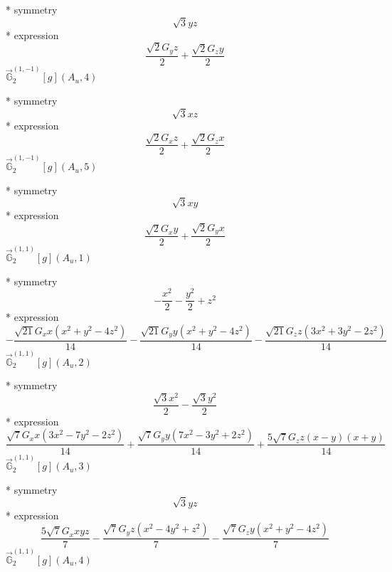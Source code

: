 \documentclass[fleqn,8pt]{jsarticle}
\begin{document}
\noindent\quad ** symmetry
\begin{dmath*}
\sqrt{3} y z
\end{dmath*}
\noindent\quad ** expression
\begin{dmath*}
\frac{\sqrt{2} G_{y} z}{2} + \frac{\sqrt{2} G_{z} y}{2}
\end{dmath*}
\noindent\quad $\vec{\mathbb{G}}_{2}^{(1,-1)}[g](A_{u},4)$

\noindent\quad ** symmetry
\begin{dmath*}
\sqrt{3} x z
\end{dmath*}
\noindent\quad ** expression
\begin{dmath*}
\frac{\sqrt{2} G_{x} z}{2} + \frac{\sqrt{2} G_{z} x}{2}
\end{dmath*}
\noindent\quad $\vec{\mathbb{G}}_{2}^{(1,-1)}[g](A_{u},5)$

\noindent\quad ** symmetry
\begin{dmath*}
\sqrt{3} x y
\end{dmath*}
\noindent\quad ** expression
\begin{dmath*}
\frac{\sqrt{2} G_{x} y}{2} + \frac{\sqrt{2} G_{y} x}{2}
\end{dmath*}
\noindent\quad $\vec{\mathbb{G}}_{2}^{(1,1)}[g](A_{u},1)$

\noindent\quad ** symmetry
\begin{dmath*}
- \frac{x^{2}}{2} - \frac{y^{2}}{2} + z^{2}
\end{dmath*}
\noindent\quad ** expression
\begin{dmath*}
- \frac{\sqrt{21} G_{x} x \left(x^{2} + y^{2} - 4 z^{2}\right)}{14} - \frac{\sqrt{21} G_{y} y \left(x^{2} + y^{2} - 4 z^{2}\right)}{14} - \frac{\sqrt{21} G_{z} z \left(3 x^{2} + 3 y^{2} - 2 z^{2}\right)}{14}
\end{dmath*}
\noindent\quad $\vec{\mathbb{G}}_{2}^{(1,1)}[g](A_{u},2)$

\noindent\quad ** symmetry
\begin{dmath*}
\frac{\sqrt{3} x^{2}}{2} - \frac{\sqrt{3} y^{2}}{2}
\end{dmath*}
\noindent\quad ** expression
\begin{dmath*}
\frac{\sqrt{7} G_{x} x \left(3 x^{2} - 7 y^{2} - 2 z^{2}\right)}{14} + \frac{\sqrt{7} G_{y} y \left(7 x^{2} - 3 y^{2} + 2 z^{2}\right)}{14} + \frac{5 \sqrt{7} G_{z} z \left(x - y\right) \left(x + y\right)}{14}
\end{dmath*}
\noindent\quad $\vec{\mathbb{G}}_{2}^{(1,1)}[g](A_{u},3)$

\noindent\quad ** symmetry
\begin{dmath*}
\sqrt{3} y z
\end{dmath*}
\noindent\quad ** expression
\begin{dmath*}
\frac{5 \sqrt{7} G_{x} x y z}{7} - \frac{\sqrt{7} G_{y} z \left(x^{2} - 4 y^{2} + z^{2}\right)}{7} - \frac{\sqrt{7} G_{z} y \left(x^{2} + y^{2} - 4 z^{2}\right)}{7}
\end{dmath*}
\noindent\quad $\vec{\mathbb{G}}_{2}^{(1,1)}[g](A_{u},4)$
\end{document}
